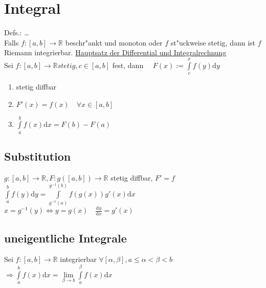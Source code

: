 \documentclass[10pt,a4paper^, twocolumn]{article}
\newcommand{\menge}{\mathbb} %
\renewcommand{\d}{\mathrm{d}} %
\begin{document}
\section{Integral}
Defs.:  \dots \\
Falls $f:[a,b] \rightarrow \menge{R}$ beschr"ankt und monoton oder $f$ st"uckweise stetig, dann ist $f$ Riemann integrierbar.
\underline{Hauptsatz der Differential und Integralrechnung} \\
	Sei $f:[a,b] \rightarrow \menge{R} stetig, c \in [a,b]$ fest, dann $\quad F(x) := \int\limits_c^x f(y) \d y$
	\begin{enumerate}
	\item stetig diffbar
	\item $F'(x) = f(x) \quad \forall x \in [a,b]$
	\item $\int\limits_a^b f(x) \d x = F(b) - F(a)$
	\end{enumerate}
\subsection{Substitution}
	$g:[a,b] \rightarrow \menge{R}, F: g([a,b]) \rightarrow \menge{R}$ stetig diffbar, $F' = f$ \\
	$\int\limits_a^b f(y) \d y = \int\limits_{g^{-1}(a)}^{g^{-1}(b)} f(g(x)) g'(x) \d x$ \\
	$x = g^{-1}(y) \Leftrightarrow y=g(x) \quad \frac{\d y}{\d x} = g'(x)$
\subsection{uneigentliche Integrale}
	Sei $f:[a,b] \rightarrow \menge{R}$ integrierbar $\forall [\alpha, \beta], a \leq \alpha < \beta < b$ \\
	$ \Rightarrow \int\limits_a^b f(x) \d x = \lim\limits_{\beta \to b} \int\limits_a^\beta f(x) \d x$
\end{document}
